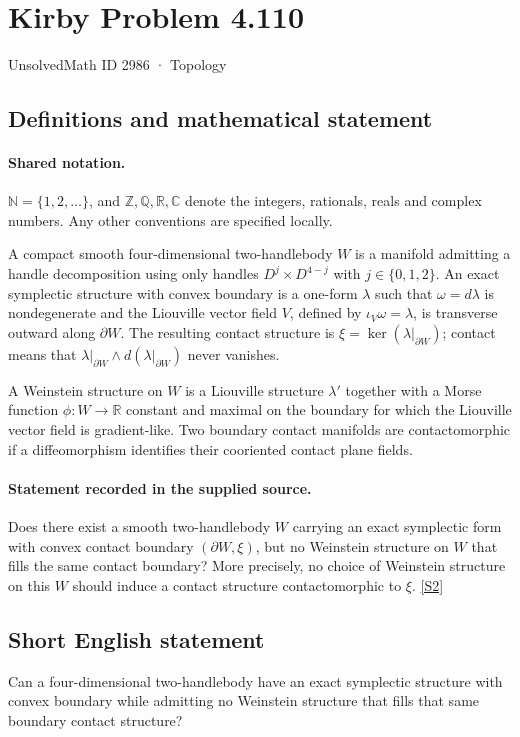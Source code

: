 \documentclass[11pt]{article}
\newcommand{\sref}[2]{\hyperlink{source:#1:#2}{[S#2]}}
\begin{document}
\setcounter{section}{2985}
\section{Kirby Problem 4.110}\label{2986}
{\small\sffamily UnsolvedMath ID 2986 · Topology}
\subsection{Definitions and mathematical statement}

\paragraph{Shared notation.}$\mathbb N=\{1,2,\ldots\}$, and $\mathbb Z,\mathbb Q,\mathbb R,\mathbb C$ denote the integers, rationals, reals and complex numbers. Any other conventions are specified locally.


A compact smooth four-dimensional two-handlebody $W$ is a manifold admitting a handle decomposition using only handles $D^j\times D^{4-j}$ with $j\in\{0,1,2\}$. An exact symplectic structure with convex boundary is a one-form $\lambda$ such that $\omega=d\lambda$ is nondegenerate and the Liouville vector field $V$, defined by $\iota_V\omega=\lambda$, is transverse outward along $\partial W$. The resulting contact structure is $\xi=\ker(\lambda|_{\partial W})$; contact means that $\lambda|_{\partial W}\wedge d(\lambda|_{\partial W})$ never vanishes.

A Weinstein structure on $W$ is a Liouville structure $\lambda'$ together with a Morse function $\phi:W\to\mathbb R$ constant and maximal on the boundary for which the Liouville vector field is gradient-like. Two boundary contact manifolds are contactomorphic if a diffeomorphism identifies their cooriented contact plane fields.
\paragraph{Statement recorded in the supplied source.}
Does there exist a smooth two-handlebody $W$ carrying an exact symplectic form with convex contact boundary $(\partial W,\xi)$, but no Weinstein structure on $W$ that fills the same contact boundary? More precisely, no choice of Weinstein structure on this $W$ should induce a contact structure contactomorphic to $\xi$. \sref{2986}{2}
\subsection{Short English statement}
Can a four-dimensional two-handlebody have an exact symplectic structure with convex boundary while admitting no Weinstein structure that fills that same boundary contact structure?
\end{document}
